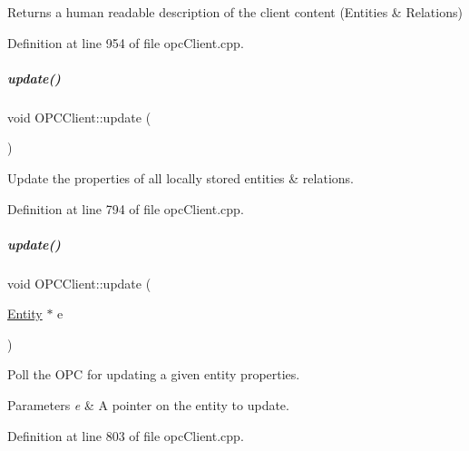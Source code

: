 Returns a human readable description of the client content (Entities \& Relations) 



Definition at line 954 of file opc\+Client.\+cpp.

\mbox{\label{group__icubclient__clients_a1f5e82e93d8d522381cf596d870ccf87}} 
\subparagraph{\texorpdfstring{update()}{update()}\hspace{0.1cm}{\footnotesize\ttfamily [1/2]}}
{\footnotesize\ttfamily void O\+P\+C\+Client\+::update (\begin{DoxyParamCaption}{ }\end{DoxyParamCaption})}



Update the properties of all locally stored entities \& relations. 



Definition at line 794 of file opc\+Client.\+cpp.

\mbox{\label{group__icubclient__clients_ad2b063f232705be47c345e331b2be8fd}} 
\subparagraph{\texorpdfstring{update()}{update()}\hspace{0.1cm}{\footnotesize\ttfamily [2/2]}}
{\footnotesize\ttfamily void O\+P\+C\+Client\+::update (\begin{DoxyParamCaption}\item[{\hyperlink{group__icubclient__representations_classicubclient_1_1Entity}{Entity} $\ast$}]{e }\end{DoxyParamCaption})}



Poll the O\+PC for updating a given entity properties. 


\begin{DoxyParams}{Parameters}
{\em e} & A pointer on the entity to update. \\
\hline
\end{DoxyParams}


Definition at line 803 of file opc\+Client.\+cpp.

